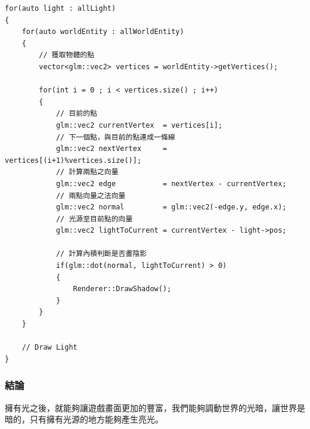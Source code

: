 \begin{lstlisting}
for(auto light : allLight)
{
    for(auto worldEntity : allWorldEntity)
    {
        // 獲取物體的點
        vector<glm::vec2> vertices = worldEntity->getVertices();
        
        for(int i = 0 ; i < vertices.size() ; i++)
        {
            // 目前的點
            glm::vec2 currentVertex  = vertices[i];
            // 下一個點，與目前的點連成一條線
            glm::vec2 nextVertex     = vertices[(i+1)%vertices.size()];
            // 計算兩點之向量
            glm::vec2 edge           = nextVertex - currentVertex;
            // 兩點向量之法向量
            glm::vec2 normal         = glm::vec2(-edge.y, edge.x);
            // 光源至目前點的向量
            glm::vec2 lightToCurrent = currentVertex - light->pos;
            
            // 計算內積判斷是否畫陰影
            if(glm::dot(normal, lightToCurrent) > 0)
            {
                Renderer::DrawShadow();
            }
        }
    }
    
    // Draw Light
}
\end{lstlisting}

\subsubsection{結論}

擁有光之後，就能夠讓遊戲畫面更加的豐富，我們能夠調動世界的光暗，讓世界是暗的，只有擁有光源的地方能夠產生亮光。



